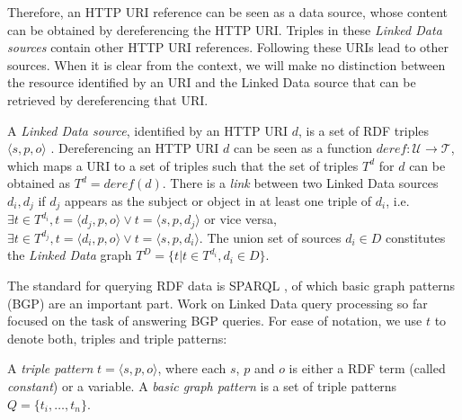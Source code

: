 Therefore, an HTTP URI reference can be seen as a data source, whose
content can be obtained by dereferencing the HTTP URI. Triples in
these \emph{Linked Data sources} contain other HTTP URI
references. Following these URIs lead to other sources. When it is
clear from the context, we will make no distinction between the
resource identified by an URI and the Linked Data source that can be
retrieved by dereferencing that URI.

\begin{definition}
  A \emph{Linked Data source}, identified by an HTTP URI $d$, is a set
  of RDF triples $\langle s,p,o \rangle$ . Dereferencing an HTTP URI
  $d$ can be seen as a function $deref : \mathcal{U} \rightarrow
  \mathcal{T}$, which maps a URI to a set of triples such that the set
  of triples $T^d$ for $d$ can be obtained as $T^d =
  \mathit{deref}(d)$. There is a \emph{link} between two Linked Data
  sources $d_i, d_j$ if $d_j$ appears as the subject or object in at
  least one triple of $d_i$, i.e. $\exists t\in T^{d_i},t=\langle
  d_j,p,o \rangle \vee t=\langle s,p,d_j \rangle$ or vice versa,
  $\exists t\in T^{d_j},t=\langle d_i,p,o \rangle \vee t=\langle
  s,p,d_i \rangle$. The union set of sources $d_i \in D$ constitutes
  the \emph{Linked Data} graph $T^D=\{t| t \in T^{d_i}, d_i \in D\}$.

\end{definition}

The standard for querying RDF data is SPARQL
\cite{prudhommeaux_sparql_2008}, of which basic graph patterns (BGP)
are an important part. Work on Linked Data query processing so far
focused on the task of answering BGP queries. For ease of notation, we
use $t$ to denote both, triples and triple patterns:


\begin{definition}
  A \emph{triple pattern} $t=\langle s,p,o \rangle$, where each $s$,
  $p$ and $o$ is either a RDF term (called \emph{constant}) or a
  variable. A \emph{basic graph pattern} is a set of triple patterns
  $Q=\{t_i,\ldots,t_n\}$.
\end{definition}

